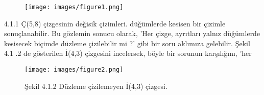 \documentclass[11pt]{amsbook}
\begin{document}


\begin{figure}[htb]
	\centering
	\texttt{[image: images/figure1.png]}
	
\end{figure}


\begin{figurename}
    4.1.1 Ç(5,8) çizgesinin değisik çizimleri.
düğümlerde kesisen bir çizimle sonuçlanabilir. Bu
gözlemin sonucu olarak, 'Her çizge, ayrıtları
yalnız düğümlerde kesisecek biçimde düzleme
çizilebilir mi ?' gibi bir soru aklımıza gelebilir. 
Şekil 4.1 .2 de gösterilen İ(4,3) çizgesini
incelersek, böyle bir sorunun karşılığını, 'her
    
\end{figurename}
    
    
\begin{figure}[htb]
	\centering
	\texttt{[image: images/figure2.png]}
	\caption{Şekil 4.1.2 Düzleme çizilemeyen İ(4,3) çizgesi.}
	
\end{figure}
    
\end{document}
